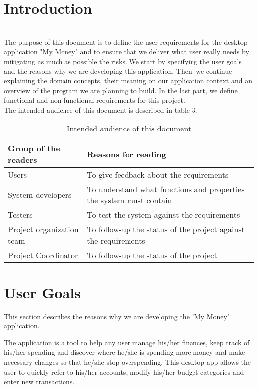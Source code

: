 \documentclass[12pt]{article}
\begin{document}
\section{Introduction} \\
 The purpose of this document is to define the user requirements for the desktop application "My Money" and to ensure that we deliver what user really needs by mitigating as much as possible the risks. We start by specifying the user goals and the reasons why we are developing this application. Then, we continue explaining the domain concepts, their meaning on our application context and an overview of the program we are planning to build. In the last part, we define functional and non-functional requirements for this project.    \\ The intended audience of this document is described in table 3. 
\begin{table}[ht]

\begin{center}

\begin{tabular}{| m{5cm} | m{10cm}|}

\hline
\textbf{Group of the readers} & \textbf{Reasons for reading} \\
 \hline Users & To give feedback about the requirements \\
\hline System developers & To understand what functions and properties the system must contain \\
\hline Testers & To test the system against the requirements \\
\hline Project organization team & To follow-up the status of the project against the requirements \\
\hline Project Coordinator & To follow-up the status of the project \\

\hline
\end{tabular}
\end{center}
\caption{Intended audience of this document} 
\end{table}

\section{User Goals}

This section describes the reasons why we are developing the "My Money" application.

The application is a tool to help any user manage his/her finances, keep track of his/her spending and discover where he/she is spending more money and make necessary changes so that he/she stop overspending.
This desktop app allows the user to quickly refer to his/her accounts, modify his/her budget categories and enter new transactions.
\end{document}
